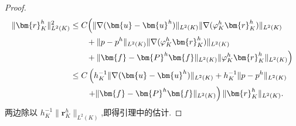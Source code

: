 \begin{proof}
{\[\begin{aligned}
 \|\bm{r}_K^h\|_{L^2(K)}^2
 &\leq C\Bigl(
   \|\nabla(\bm{u}-\bm{u}^h)\|_{L^2(K)}
      \|\nabla(\varphi_K^h\bm{r}_K^h)\|_{L^2(K)}\\
 &\qquad+\|p-p^h\|_{L^2(K)}
      \|\nabla(\varphi_K^h\bm{r}_K^h)\|_{L^2(K)}\\
 &\qquad+\|\bm{f}-\bm{P}^h\bm{f}\|_{L^2(K)}
       \|\varphi_K^h\bm{r}_K^h\|_{L^2(K)}
 \Bigr)\\
  &\leq C\left(
   h_K^{-1}\|\nabla(\bm{u}-\bm{u}^h)\|_{L^2(K)}
   +h_K^{-1}\|p-p^h\|_{L^2(K)}\right.\\
  &\qquad\left.
   +\|\bm{f}-\bm{P}^h\bm{f}\|_{L^2(K)}
  \right)\|\bm{r}_K^h\|_{L^2(K)}.
\end{aligned}
\]
}
两边除以 $h_K^{-1}\|\bm{r}_K^h\|_{L^2(K)}$,即得引理中的估计.
\end{proof}

